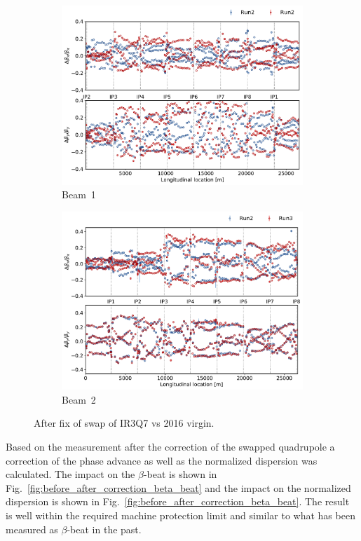 \documentclass[a4paper]{cernatsnote}
\begin{document}
\begin{figure}[ht]
\begin{subfigure}{.5\textwidth}
  \centering
  \includegraphics[width=.8\linewidth]{plots/beam1/beta_beat_virgin_2016_2021.pdf}  
  \caption{Beam~1}
  \label{fig:sub-first}
\end{subfigure}
\begin{subfigure}{.5\textwidth}
  \centering
  \includegraphics[width=.8\linewidth]{plots/beam2/B2_BetaBeat_afterIR3Q7fix_vs_virgin2016.pdf}  
  \caption{Beam~2}
  \label{fig:sub-second}
\end{subfigure}
\caption{After fix of swap of IR3Q7 vs 2016 virgin.}
\label{fig:after_swap_vs_2016}
\end{figure}

Based on the measurement after the correction of the swapped quadrupole a correction of the phase advance as well as the normalized dispersion was calculated. The impact on the $\beta$-beat is shown in Fig.~\ref{fig:before_after_correction_beta_beat} and the impact on the normalized dispersion is shown in Fig.~\ref{fig:before_after_correction_beta_beat}. The result is well within the required machine protection limit and similar to what has been measured as $\beta$-beat in the past. 
\end{document}
